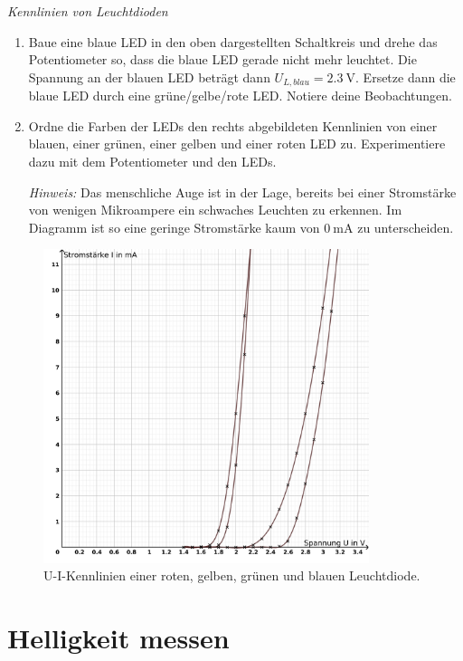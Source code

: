 \begin{aufgabe} \emph{Kennlinien von Leuchtdioden}
	\begin{enumerate}[label=\alph*), itemsep=0mm, parsep=0mm]
		\item Baue eine blaue LED in den oben dargestellten Schaltkreis und drehe das Potentiometer so, dass die blaue LED gerade nicht mehr leuchtet. Die Spannung an der blauen LED beträgt dann $U_{L,blau}=\SI{2,3}{\volt}$. Ersetze dann die blaue LED durch eine grüne/gelbe/rote LED. Notiere deine Beobachtungen.
		\item Ordne die Farben der LEDs den rechts abgebildeten Kennlinien von einer blauen, einer grünen, einer gelben und einer roten LED zu. Experimentiere dazu mit dem Potentiometer und den LEDs.
		
		\emph{Hinweis:} Das menschliche Auge ist in der Lage, bereits bei einer Stromstärke von wenigen Mikroampere ein schwaches Leuchten zu erkennen. Im Diagramm ist so eine geringe Stromstärke kaum von $\SI{0}{\milli\ampere}$ zu unterscheiden.
	\end{enumerate}

	\begin{figure}[H]
		\centering
		\includegraphics[width=0.85\textwidth]{./Zeichnungen/Diodenkennlinien.png}
		\caption{U-I-Kennlinien einer roten, gelben, grünen und blauen Leuchtdiode.}
	\end{figure}
\end{aufgabe}
\vfill

\section{Helligkeit messen}\label{sec:ldr}

